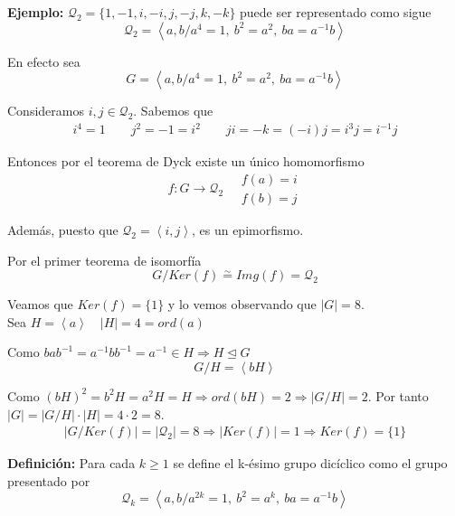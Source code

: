 \documentclass{article}
\begin{document}
\textbf{Ejemplo:} $\mathcal{Q}_2=\{1,-1,i,-i,j,-j,k,-k\}$ puede ser representado como sigue
\begin{equation*}
\mathcal{Q}_2=\left\langle a,b/a^4=1,\:b^2=a^2,\:ba=a^{-1}b\right\rangle
\end{equation*}

En efecto sea
\begin{equation*}
G=\left\langle a,b/a^4=1,\:b^2=a^2,\:ba=a^{-1}b\right\rangle
\end{equation*}

Consideramos $i,j\in \mathcal{Q}_2$. Sabemos que 
\begin{gather*}
i^4=1\qquad j^2=-1=i^2\qquad ji=-k=(-i)j=i^3j=i^{-1}j
\end{gather*}

Entonces por el teorema de Dyck existe un único homomorfismo
\begin{equation*}
f:G\longrightarrow\mathcal{Q}_2\quad \left.\begin{array}{c}
f(a)=i\\
f(b)=j
\end{array}\right.
\end{equation*}

Además, puesto que $\mathcal{Q}_2=\left\langle i,j\right\rangle$, es un epimorfismo.

Por el primer teorema de isomorfía
\begin{equation*}
G/Ker(f)\overset{\sim}{=} Img(f)=\mathcal{Q}_2
\end{equation*}

Veamos que $Ker(f)=\{1\}$ y lo vemos observando que $|G|=8$. \\

Sea $H=\left\langle a\right\rangle\quad |H|=4=ord(a)$ 

Como $bab^{-1}=a^{-1}bb^{-1}=a^{-1}\in H\Rightarrow H\unlhd G$
\begin{equation*}
G/H=\left\langle bH\right\rangle
\end{equation*} 

Como $(bH)^2=b^2H=a^2H=H\Rightarrow ord(bH)=2\Rightarrow |G/H|=2$. Por tanto $|G|=|G/H|\cdot |H|=4\cdot 2=8$. 
\begin{gather*}
|G/Ker(f)|=|\mathcal{Q}_2|=8\Rightarrow |Ker(f)|=1\Rightarrow Ker(f)=\{1\}
\end{gather*}

\textbf{Definición:} Para cada $k\geq 1$ se define el k-ésimo grupo dicíclico como el grupo presentado por
\begin{equation*}
\mathcal{Q}_k=\left\langle a,b/a^{2k}=1,\:b^2=a^k,\:ba=a^{-1}b\right\rangle
\end{equation*}
\end{document}
